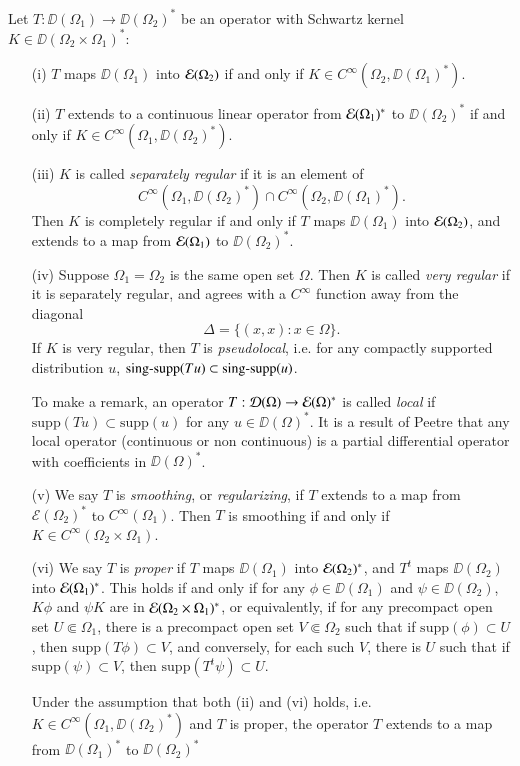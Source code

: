 \begin{theorem}
    Let $T: \DD(\Omega_1) \to \DD(\Omega_2)^*$ be an operator with Schwartz kernel $K \in \DD(\Omega_2 \times \Omega_1)^*$:
\begin{itemize}
    \item[(i)] $T$ maps $\DD(\Omega_1)$ into $\operatorname{\mathcal{E}}(\Omega_2)$ if and only if $K \in C^\infty(\Omega_2, \DD(\Omega_1)^*)$.

    \item[(ii)] $T$ extends to a continuous linear operator from $\operatorname{\mathcal{E}}(\Omega_1)^*$ to $\DD(\Omega_2)^*$ if and only if $K \in C^\infty(\Omega_1, \DD(\Omega_2)^*)$.

    \item[(iii)] $K$ is called \emph{separately regular} if it is an element of
    \[ C^\infty(\Omega_1, \DD(\Omega_2)^*) \cap C^\infty(\Omega_2, \DD(\Omega_1)^*). \]
    Then $K$ is completely regular if and only if $T$ maps $\DD(\Omega_1)$ into $\operatorname{\mathcal{E}}(\Omega_2)$, and extends to a map from $\operatorname{\mathcal{E}}(\Omega_1)$ to $\DD(\Omega_2)^*$.

    \item[(iv)] Suppose $\Omega_1 = \Omega_2$ is the same open set $\Omega$. Then $K$ is called \emph{very regular} if it is separately regular, and agrees with a $C^\infty$ function away from the diagonal
    \[ \Delta = \{ (x,x) : x \in \Omega \}. \]
    If $K$ is very regular, then $T$ is \emph{pseudolocal}, i.e. for any compactly supported distribution $u$, $\operatorname{\text{sing-supp}}(Tu) \subset \operatorname{\text{sing-supp}}(u)$.

    To make a remark, an operator $T: \operatorname{\mathcal{D}}(\Omega) \to \operatorname{\mathcal{E}}(\Omega)^*$ is called \emph{local} if $\text{supp}(Tu) \subset \text{supp}(u)$ for any $u \in \DD(\Omega)^*$. It is a result of Peetre that any local operator (continuous or non continuous) is a partial differential operator with coefficients in $\DD(\Omega)^*$.

    \item[(v)] We say $T$ is \emph{smoothing}, or \emph{regularizing}, if $T$ extends to a map from $\mathcal{E}(\Omega_2)^*$ to $C^\infty(\Omega_1)$. Then $T$ is smoothing if and only if $K \in C^\infty(\Omega_2 \times \Omega_1)$.

    \item[(vi)] We say $T$ is \emph{proper} if $T$ maps $\DD(\Omega_1)$ into $\operatorname{\mathcal{E}}(\Omega_2)^*$, and $T^t$ maps $\DD(\Omega_2)$ into $\operatorname{\mathcal{E}}(\Omega_1)^*$. This holds if and only if for any $\phi \in \DD(\Omega_1)$ and $\psi \in \DD(\Omega_2)$, $K \phi$ and $\psi K$ are in $\operatorname{\mathcal{E}}(\Omega_2 \times \Omega_1)^*$, or equivalently, if for any precompact open set $U \Subset \Omega_1$, there is a precompact open set $V \Subset \Omega_2$ such that if $\text{supp}(\phi) \subset U$, then $\text{supp}(T \phi) \subset V$, and conversely, for each such $V$, there is $U$ such that if $\text{supp}(\psi) \subset V$, then $\text{supp}(T^t \psi) \subset U$.

    Under the assumption that both (ii) and (vi) holds, i.e. $K \in C^\infty(\Omega_1, \DD(\Omega_2)^*)$ and $T$ is proper, the operator $T$ extends to a map from $\DD(\Omega_1)^*$ to $\DD(\Omega_2)^*$
\end{itemize}

\end{theorem}
